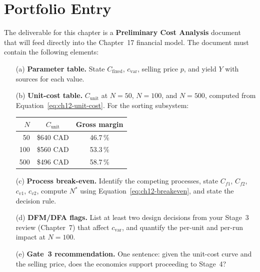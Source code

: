 \section*{Portfolio Entry}
\label{sec:ch12-artifact}

The deliverable for this chapter is a \textbf{Preliminary Cost Analysis} document that will feed directly into the Chapter~17 financial model.
The document must contain the following elements:

\begin{enumerate}
  \item[(a)] \textbf{Parameter table.} State $C_{\text{fixed}}$, $c_{\text{var}}$,
        selling price $p$, and yield $Y$ with sources for each value.

  \item[(b)] \textbf{Unit-cost table.} $C_{\text{unit}}$ at $N = 50$, $N = 100$,
        and $N = 500$, computed from Equation~\ref{eq:ch12-unit-cost}.
        For the sorting subsystem:

        \begin{center}
        \begin{tabular}{rcc}
          \hline
          $N$ & $C_{\text{unit}}$ & Gross margin \\
          \hline
           50 & \$640 CAD & 46.7\,\% \\
          100 & \$560 CAD & 53.3\,\% \\
          500 & \$496 CAD & 58.7\,\% \\
          \hline
        \end{tabular}
        \end{center}

  \item[(c)] \textbf{Process break-even.} Identify the competing processes,
        state $C_{f1}$, $C_{f2}$, $c_{v1}$, $c_{v2}$, compute $N^{*}$ using
        Equation~\ref{eq:ch12-breakeven}, and state the decision rule.

  \item[(d)] \textbf{DFM/DFA flags.} List at least two design decisions from
        your Stage~3 review (Chapter~7) that affect $c_{\text{var}}$, and
        quantify the per-unit and per-run impact at $N = 100$.

  \item[(e)] \textbf{Gate~3 recommendation.} One sentence: given the unit-cost
        curve and the selling price, does the economics support proceeding to
        Stage~4?
\end{enumerate}


